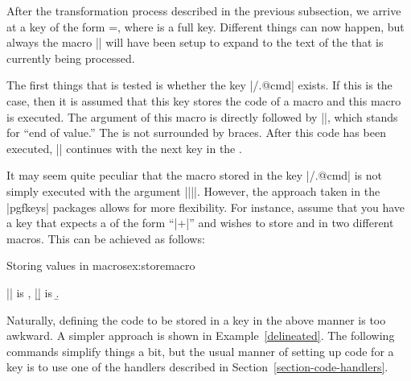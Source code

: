 \label{section-key-code}

After the transformation process described in the previous subsection,
we arrive at a key of the form =, where
 is a full key. Different things can now happen, but always
the macro |\pgfkeyscurrentkey| will have been setup to expand to the
text of the  that is currently being processed.

The first things that is tested is whether the key |/.@cmd|
exists. If this is the case, then it is assumed that this key stores
the code of a macro and this macro is executed. The argument of this
macro is  directly followed by |\pgfeov|, which stands for
``end of value.'' The  is not surrounded by braces. After
this code has been executed, |\pgfkeys| continues with the next key in
the .

It may seem quite peculiar that the macro stored in the key
|/.@cmd| is not simply executed with the argument
|{||}|. However, the approach taken in the |pgfkeys|
packages allows for more flexibility. For instance, assume that you
have a key that expects a  of the form
``|+|'' and wishes to store  and
 in two different macros. This can be achieved as
follows:

\begin{texexample}{Storing values in macros}{ex:storemacro}{ }

\def\mystore#1+#2\pgfeov{\def\a{#1}\def\b{#2}}

|\a| is \a, |\b| is \b.
\end{texexample}

Naturally, defining the code to be stored in a key in the above manner
is too awkward. A simpler approach is shown in Example~\ref{delineated}. The following commands simplify things a bit, but the
usual manner of setting up code for a key is to use one of the
handlers described in Section~\ref{section-code-handlers}.


